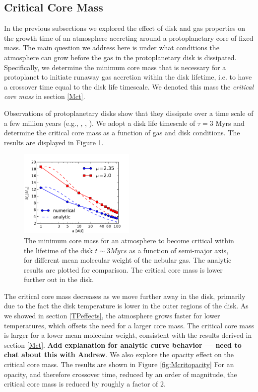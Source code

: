 \documentclass[apj]{emulateapj}
\begin{document}
\subsection{Critical Core Mass}
\label{critcore}

In the previous subsections we explored the effect of disk and gas properties on the growth time of an atmosphere accreting around a protoplanetary core of fixed mass. The main question we address here is under what conditions the atmosphere can grow before the gas in the protoplanetary disk is dissipated. Specifically, we determine the minimum core mass that is necessary for a protoplanet to initiate runaway gas accretion within the disk lifetime, i.e. to have a crossover time equal to the disk life timescale. We  denoted this mass the \textit{critical core mass} in section \ref{Mct}.

Observations of protoplanetary disks show that they dissipate over a time scale of a few million years (e.g., \citealt{lagrange00}, \citealt{haisch01}, \citealt{goldreich04}). We adopt a disk life timescale of $\tau=3 $ Myrs and determine the critical core mass as a function of gas and disk conditions. The results are displayed in Figure \ref{fig:Mcvsa}. 

\begin{figure}[h]
\centering
\includegraphics[width=0.5\textwidth]{../../figs/ModelAtmospheres/RadSelfGravPoly/PaperFigs/Mcrit_vs_a_3Myrs_new.pdf}
\caption{The minimum core mass for an atmosphere to become critical within the lifetime of the disk $t \sim 3 Myrs$ as a function of semi-major axis, for different mean molecular weight of the nebular gas. The analytic results are plotted for comparison. The critical core mass is lower further out in the disk.}
\label{fig:Mcvsa}
\end{figure}

The critical core mass decreases as we move further away in the disk, primarily due to the fact the disk temperature is lower in the outer regions of the disk. As we showed in section \ref{TPeffects}, the atmosphere grows faster for lower temperatures, which offsets the need for a larger core mass. The critical core mass is larger for a lower mean molecular weight, consistent with the results derived in section \ref{Mct}. \textbf{Add explanation for analytic curve behavior --- need to chat about this with Andrew}. We also explore the opacity effect on the critical core mass. The results are shown in Figure \ref{fig:Mcritopacity} For an opacity, and therefore crossover time, reduced by an order of magnitude, the critical core mass is reduced by roughly a factor of 2. 
\end{document}
